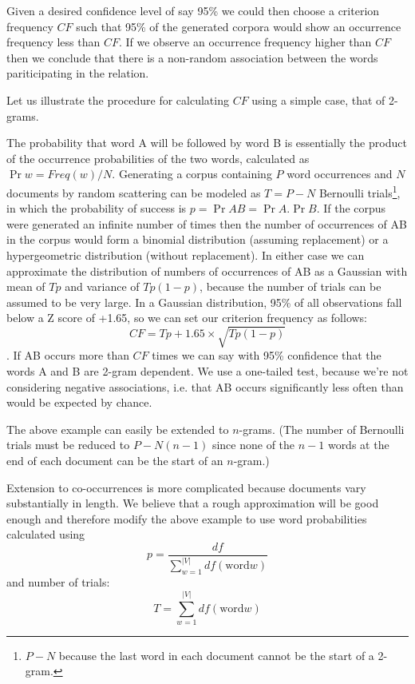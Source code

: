 \documentclass[11pt]{report}
\begin{document}
Given a desired confidence level of say 95\% we could
then choose a criterion frequency $\mathit{CF}$ such that 95\% of the
generated corpora would show an occurrence frequency less than
$\mathit{CF}$.  If we observe an occurrence frequency higher than
$\mathit{CF}$ then we conclude that there is a non-random association
between the words pariticipating in the relation.


Let us
illustrate the procedure for calculating $\mathit{CF}$ using a
simple case, that of 2-grams.

The probability that word A will be followed by word B is essentially
the product of the occurrence probabilities of the two words,
calculated as $\Pr{w} = \mathit{Freq}(w) / N$.  Generating a corpus
containing $P$ word occurrences and $N$ documents by random scattering
can be modeled as $T = P - N$ Bernoulli trials\footnote{$P - N$ because the
  last word in each document cannot be the start of a 2-gram.}, in
which the probability of success is $p = \Pr{AB} = \Pr{A}.\Pr{B}$.
If the corpus were generated an infinite number of times then the
number of occurrences of AB in the corpus would form a binomial
distribution (assuming replacement) or a hypergeometric distribution
(without replacement).  In either case we can approximate the distribution of
numbers of occurrences of AB as a Gaussian with mean of $Tp$ and
variance of $Tp(1 - p)$, because the number of trials can be assumed to
be very large.  In a Gaussian distribution, 95\% of all
observations fall below a Z score of +1.65, so we can set our
criterion frequency as follows:
\[\mathit{CF} = Tp + 1.65 \times \sqrt{Tp(1 - p)}\].  If AB occurs
more than $\mathit{CF}$ times we can say with 95\% confidence that the
words A and B are 2-gram dependent.  We use a one-tailed test, because we're
not considering negative associations, i.e. that AB occurs
significantly less often than would be expected by chance.

The above example can easily be extended to $n$-grams.  (The number of
Bernoulli trials must be reduced to $P - N(n-1)$ since none of the $n - 1$
words at the end of each document can be the start of an $n$-gram.)

Extension to co-occurrences is more complicated because documents vary
substantially in length.  We believe that a rough approximation will
be good enough and therefore modify the above example to use word
probabilities calculated using
\[p = \frac{\mathit{df}}{\sum\limits_{w=1}^{|V|} \mathit{df}(\mathrm{word}
  w)}\]
and number of trials:
\[T = \sum\limits_{w=1}^{|V|} \mathit{df}(\mathrm{word}
  w)\]
\end{document}

